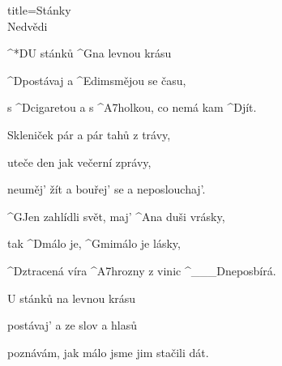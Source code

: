 \begin{song}{title=\predtitle\centering Stánky \\\large Nedvědi \vspace*{-0.3cm}}  %
\begin{centerjustified}
\nejnejvetsi

\sloka
	^*{D}U\: stánků ^{G}na levnou krásu

	^{D\z}postávaj a ^{Edim\z}smějou se času,

	s ^{D\z}cigaretou a s ^{A7\z}holkou, co nemá kam ^{D}jít.

\sloka
	Skleniček pár a pár tahů z trávy,
   	
   	uteče den jak večerní zprávy,
   	
   	neuměj' žít a bouřej' se a neposlouchaj'.

	^{G}Jen zahlídli svět, maj' ^{A}na duši vrásky,

	tak ^{D\z}málo je, ^{Gmi}málo je lásky,

	^{D\z}ztracená víra ^{A7\z}hrozny z vinic ^{{\color{white}\_\_\_}D}neposbírá.

\sloka
	U stánků na levnou krásu
   	
   	postávaj' a ze slov a hlasů
   	
   	poznávám, jak málo jsme jim stačili dát.




\end{centerjustified}
\setcounter{Slokočet}{0}
\end{song}
